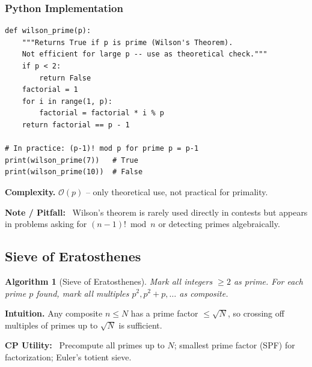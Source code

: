 \documentclass[10pt,a4paper]{article}
\theoremstyle{cpstyle}
\newtheorem{algorithm}[theorem]{Algorithm}
\newenvironment{cpnote}{%
  \begin{mdframed}[backgroundcolor=notebg, linecolor=orange!70, linewidth=1pt,
    innerleftmargin=10pt, innerrightmargin=10pt, innertopmargin=6pt, innerbottommargin=6pt]
  \textbf{\color{orange!80!black}Note / Pitfall:}~}{%
  \end{mdframed}}
\newenvironment{cputility}{%
  \begin{mdframed}[backgroundcolor=theorembg, linecolor=accent!50, linewidth=1pt,
    innerleftmargin=10pt, innerrightmargin=10pt, innertopmargin=6pt, innerbottommargin=6pt]
  \textbf{\color{accent}CP Utility:}~}{%
  \end{mdframed}}
\newcommand{\bigO}[1]{\mathcal{O}\!\left(#1\right)}
\begin{document}
\subsubsection{Python Implementation}
\begin{lstlisting}[caption={Wilson's Theorem -- primality test}]
def wilson_prime(p):
    """Returns True if p is prime (Wilson's Theorem).
    Not efficient for large p -- use as theoretical check."""
    if p < 2:
        return False
    factorial = 1
    for i in range(1, p):
        factorial = factorial * i % p
    return factorial == p - 1

# In practice: (p-1)! mod p for prime p = p-1
print(wilson_prime(7))   # True
print(wilson_prime(10))  # False
\end{lstlisting}

\textbf{Complexity.} $\bigO{p}$ -- only theoretical use, not practical for primality.

\begin{cpnote}
Wilson's theorem is rarely used directly in contests but appears in problems asking for $(n-1)! \bmod n$ or detecting primes algebraically.
\end{cpnote}

\subsection{Sieve of Eratosthenes}

\begin{algorithm}[Sieve of Eratosthenes]
Mark all integers $\geq 2$ as prime. For each prime $p$ found, mark all multiples $p^2, p^2+p, \ldots$ as composite.
\end{algorithm}

\textbf{Intuition.} Any composite $n \leq N$ has a prime factor $\leq \sqrt{N}$, so crossing off multiples of primes up to $\sqrt{N}$ is sufficient.

\begin{cputility}
Precompute all primes up to $N$; smallest prime factor (SPF) for factorization; Euler's totient sieve.
\end{cputility}
\end{document}
